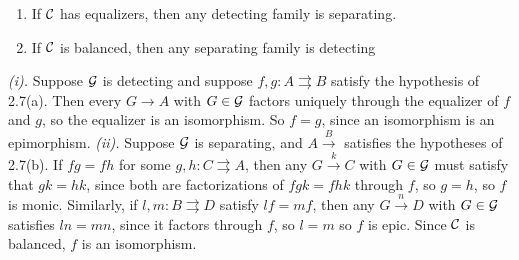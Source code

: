 \documentclass{article}
\begin{document}
\begin{fancylem}{}\hspace{0.1cm}
    \begin{enumerate}
        \item[(i)] If $\mathcal{C}$ has equalizers, then any detecting family is separating.
        \item[(ii)] If $\mathcal{C}$ is balanced, then any separating family is detecting 
    \end{enumerate}
\end{fancylem}
\proof \textit{(i).} Suppose $\mathcal{G}$ is detecting and suppose $f,g: A \rightrightarrows B$ satisfy the hypothesis of 2.7(a). Then every $G \to A$ with $G \in \mathcal{G}$ factors uniquely through the equalizer of $f$ and $g$, so the equalizer is an isomorphism. So $f=g$, since an isomorphism is an epimorphism.\gap
\textit{(ii).} Suppose $\mathcal{G}$ is separating, and $A \xrightarrow B$ satisfies the hypotheses of 2.7(b). If $fg=fh$ for some $g,h : C \rightrightarrows A$, then any $G \xrightarrow k C$ with $G \in \mathcal{G}$ must satisfy that $gk=hk$, since both are factorizations of $fgk=fhk$ through $f$, so $g=h$, so $f$ is monic. Similarly, if $
l, m: B \rightrightarrows D$ satisfy $lf=mf$, then any $G \xrightarrow n D$ with $G \in \mathcal{G}$ satisfies $ln =mn$, since it factors through $f$, so $l=m$ so $f$ is epic. Since $\mathcal{C}$ is balanced, $f$ is an isomorphism. \endproof
\end{document}
